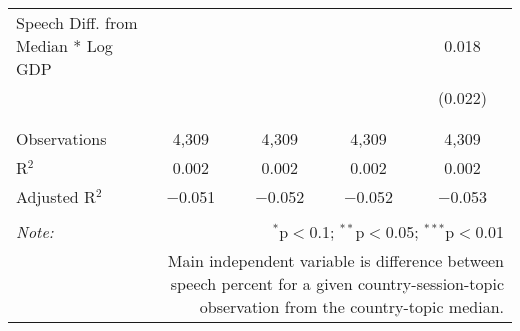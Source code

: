 \begin{table}[!htbp]
\begin{tabular}{@{\extracolsep{5pt}}lcccc}
 Speech Diff. from Median * Log GDP &  &  &  & 0.018 \\ 
  &  &  &  & (0.022) \\ 
  & & & & \\ 
\hline \\[-1.8ex] 
Observations & 4,309 & 4,309 & 4,309 & 4,309 \\ 
R$^{2}$ & 0.002 & 0.002 & 0.002 & 0.002 \\ 
Adjusted R$^{2}$ & $-$0.051 & $-$0.052 & $-$0.052 & $-$0.053 \\ 
\hline 
\hline \\[-1.8ex] 
\textit{Note:}  & \multicolumn{4}{r}{$^{*}$p$<$0.1; $^{**}$p$<$0.05; $^{***}$p$<$0.01} \\ 
 & \multicolumn{4}{r}{Main independent variable is difference between speech percent for a given country-session-topic observation from the country-topic median.} \\ 
\end{tabular} 
\end{table} 
